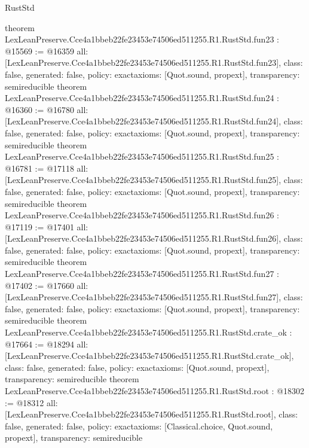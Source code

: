 \begin{lexlean}{RustStd}
\begin{coremodule}
{}
theorem LexLeanPreserve.Cce4a1bbeb22fe23453e74506ed511255.R1.RustStd.fun23 : @15569 := @16359 {
  all: [LexLeanPreserve.Cce4a1bbeb22fe23453e74506ed511255.R1.RustStd.fun23],
  class: false,
  generated: false,
  policy: exact{axioms: [Quot.sound, propext]},
  transparency: semireducible
}
theorem LexLeanPreserve.Cce4a1bbeb22fe23453e74506ed511255.R1.RustStd.fun24 : @16360 := @16780 {
  all: [LexLeanPreserve.Cce4a1bbeb22fe23453e74506ed511255.R1.RustStd.fun24],
  class: false,
  generated: false,
  policy: exact{axioms: [Quot.sound, propext]},
  transparency: semireducible
}
theorem LexLeanPreserve.Cce4a1bbeb22fe23453e74506ed511255.R1.RustStd.fun25 : @16781 := @17118 {
  all: [LexLeanPreserve.Cce4a1bbeb22fe23453e74506ed511255.R1.RustStd.fun25],
  class: false,
  generated: false,
  policy: exact{axioms: [Quot.sound, propext]},
  transparency: semireducible
}
theorem LexLeanPreserve.Cce4a1bbeb22fe23453e74506ed511255.R1.RustStd.fun26 : @17119 := @17401 {
  all: [LexLeanPreserve.Cce4a1bbeb22fe23453e74506ed511255.R1.RustStd.fun26],
  class: false,
  generated: false,
  policy: exact{axioms: [Quot.sound, propext]},
  transparency: semireducible
}
theorem LexLeanPreserve.Cce4a1bbeb22fe23453e74506ed511255.R1.RustStd.fun27 : @17402 := @17660 {
  all: [LexLeanPreserve.Cce4a1bbeb22fe23453e74506ed511255.R1.RustStd.fun27],
  class: false,
  generated: false,
  policy: exact{axioms: [Quot.sound, propext]},
  transparency: semireducible
}
theorem LexLeanPreserve.Cce4a1bbeb22fe23453e74506ed511255.R1.RustStd.crate_ok : @17664 := @18294 {
  all: [LexLeanPreserve.Cce4a1bbeb22fe23453e74506ed511255.R1.RustStd.crate_ok],
  class: false,
  generated: false,
  policy: exact{axioms: [Quot.sound, propext]},
  transparency: semireducible
}
theorem LexLeanPreserve.Cce4a1bbeb22fe23453e74506ed511255.R1.RustStd.root : @18302 := @18312 {
  all: [LexLeanPreserve.Cce4a1bbeb22fe23453e74506ed511255.R1.RustStd.root],
  class: false,
  generated: false,
  policy: exact{axioms: [Classical.choice, Quot.sound, propext]},
  transparency: semireducible
}


\end{coremodule}
\end{lexlean}
